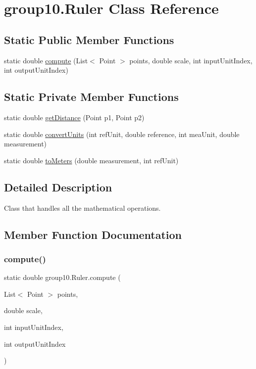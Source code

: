 \hypertarget{classgroup10_1_1_ruler}{}\section{group10.\+Ruler Class Reference}
\label{classgroup10_1_1_ruler}
\subsection*{Static Public Member Functions}
\begin{DoxyCompactItemize}
\item 
static double \hyperlink{classgroup10_1_1_ruler_a80bd8e8dfeeb8e4160486ad01d6ca03e}{compute} (List$<$ Point $>$ points, double scale, int input\+Unit\+Index, int output\+Unit\+Index)
\end{DoxyCompactItemize}
\subsection*{Static Private Member Functions}
\begin{DoxyCompactItemize}
\item 
static double \hyperlink{classgroup10_1_1_ruler_a9dec5abc444282d874dc441fe66daa40}{get\+Distance} (Point p1, Point p2)
\item 
static double \hyperlink{classgroup10_1_1_ruler_a3447089ea321fa737049b10daaecfa0e}{convert\+Units} (int ref\+Unit, double reference, int mea\+Unit, double measurement)
\item 
static double \hyperlink{classgroup10_1_1_ruler_a23c8d18380fb06f65ee8722a355baebf}{to\+Meters} (double measurement, int ref\+Unit)
\end{DoxyCompactItemize}


\subsection{Detailed Description}
Class that handles all the mathematical operations. 

\subsection{Member Function Documentation}
\mbox{\label{classgroup10_1_1_ruler_a80bd8e8dfeeb8e4160486ad01d6ca03e}} 
\subsubsection{\texorpdfstring{compute()}{compute()}}
{\footnotesize\ttfamily static double group10.\+Ruler.\+compute (\begin{DoxyParamCaption}\item[{List$<$ Point $>$}]{points,  }\item[{double}]{scale,  }\item[{int}]{input\+Unit\+Index,  }\item[{int}]{output\+Unit\+Index }\end{DoxyParamCaption})\hspace{0.3cm}{\ttfamily [static]}}

